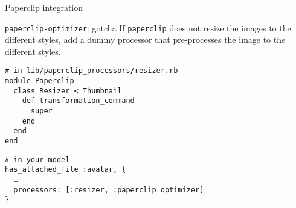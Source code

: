 \documentclass{beamer}
\begin{document}
\begin{frame}[fragile]{Paperclip integration}
\begin{block}{\lstinline{paperclip-optimizer}: gotcha}
If \lstinline{paperclip} does not resize the images to the different styles,
add a dummy processor that pre-processes the image to the different styles.
\begin{lstlisting}
# in lib/paperclip_processors/resizer.rb
module Paperclip
  class Resizer < Thumbnail
    def transformation_command
      super
    end
  end
end
\end{lstlisting}
\begin{lstlisting}
# in your model
has_attached_file :avatar, {
  …
  processors: [:resizer, :paperclip_optimizer]
}
\end{lstlisting}
\end{block}
\end{frame}
\end{document}
